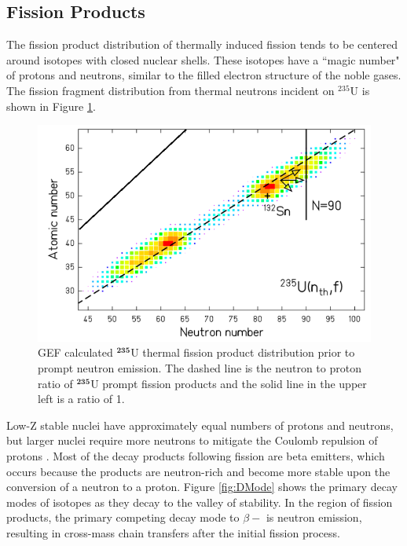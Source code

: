 \subsection{Fission Products}

The fission product distribution of thermally induced fission tends to be centered around isotopes with closed nuclear shells. 
These isotopes  have a ``magic number" of protons and neutrons, similar to the filled electron structure of the noble gases. 
The fission fragment distribution from thermal neutrons incident on $^{235}$U is shown in Figure \ref{fig:GEF_U}. 

\begin{figure}[htb!]
	\includegraphics[width=\linewidth]{Figures/Chapter2/U_235Band.png}
	\caption[GEF calculated $\mathrm{^{235}}$U thermal fission product distribution prior to prompt neutron emission.]{GEF calculated $\mathbf{^{235}}$U thermal fission product distribution prior to prompt neutron emission. The dashed line is the neutron to proton ratio of $\mathbf{^{235}}$U prompt fission products and the solid line in the upper left is a ratio of 1\cite{Schmidt2014}.}
	\label{fig:GEF_U}	
\end{figure}

Low-Z stable nuclei have approximately equal numbers of protons and neutrons, but larger nuclei require more neutrons to mitigate the Coulomb repulsion of protons \cite{Krane}. 
Most of the decay products following fission are beta emitters, which occurs because the products are neutron-rich and become more stable upon the conversion of a neutron to a proton. 
Figure \ref{fig:DMode} shows the primary decay modes of isotopes as they decay to the valley of stability. 
In the region of fission products, the primary competing decay mode to $\beta{-}$ is neutron emission, resulting in cross-mass chain transfers after the initial fission process. 

